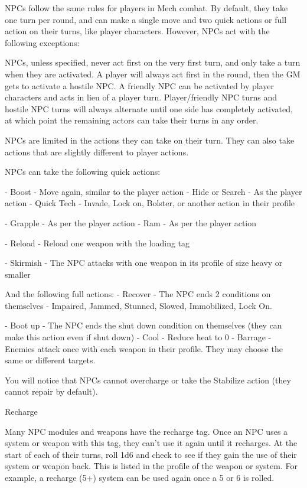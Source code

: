 NPCs follow the same rules for players in Mech combat. By default, they take one turn per
round, and can make a single move and two quick actions or full action on their turns, like
player characters. However, NPCs act with the following exceptions:


NPCs, unless specified, never act first on the very first turn, and only take a turn when they
are activated. A player will always act first in the round, then the GM gets to activate a hostile
NPC. A friendly NPC can be activated by player characters and acts in lieu of a player turn.
Player/friendly NPC turns and hostile NPC turns will always alternate until one side has
completely activated, at which point the remaining actors can take their turns in any order.




NPCs are limited in the actions they can take on their turn. They can also take actions that
are slightly different to player actions.

NPCs can take the following quick actions:

             -   Boost - Move again, similar to the player action
             -   Hide or Search - As the player action
             -   Quick Tech - Invade, Lock on, Bolster, or another action in their profile

             -   Grapple - As per the player action
             -   Ram - As per the player action

             -   Reload - Reload one weapon with the loading tag

             -   Skirmish - The NPC attacks with one weapon in its profile of size heavy or smaller

And the following full actions:
             -   Recover - The NPC ends 2 conditions on themselves - Impaired, Jammed,
                 Stunned, Slowed, Immobilized, Lock On.

             -   Boot up - The NPC ends the shut down condition on themselves (they can make
                 this action even if shut down)
             -   Cool - Reduce heat to 0
             -   Barrage - Enemies attack once with each weapon in their profile. They may
                 choose the same or different targets.

You will notice that NPCs cannot overcharge or take the Stabilize action (they cannot repair by
default).

                                                   Recharge

Many NPC modules and weapons have the recharge tag. Once an NPC uses a system or
weapon with this tag, they can’t use it again until it recharges. At the start of each of their turns,
roll 1d6 and check to see if they gain the use of their system or weapon back. This is listed in the
profile of the weapon or system. For example, a recharge (5+) system can be used again once a
5 or 6 is rolled.


